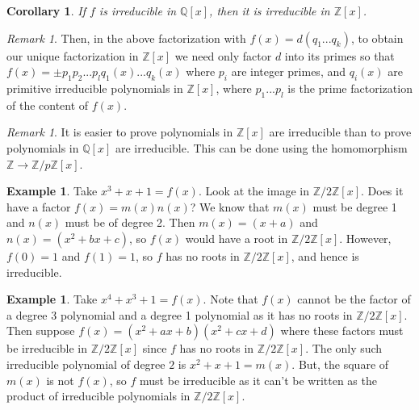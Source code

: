 \documentclass[12pt]{article}
\newtheorem{cor}[thm]{Corollary}
\theoremstyle{definition}
\newtheorem{eg}[thm]{Example}
\theoremstyle{remark}
\newtheorem{rmk}[thm]{Remark}
\numberwithin{equation}{section}
\newcommand\Z{\mathbb Z}    %
\newcommand\Q{\mathbb Q}    %
\begin{document}
\vspace{15pt}

\begin{cor}
        If $f$ is irreducible in $\Q[x]$, then it is irreducible in $\Z[x]$.
\end{cor}

\vspace{15pt}

\begin{rmk}
        Then, in the above factorization with $f(x) = d(q_1...q_k)$, to obtain our unique factorization in $\Z[x]$ we need only factor $d$ into its primes so that $f(x) = \pm p_1p_2...p_lq_1(x)...q_k(x)$ where $p_i$ are integer primes, and $q_i(x)$ are primitive irreducible polynomials in $\Z[x]$, where $p_1...p_l$ is the prime factorization of the content of $f(x)$.
\end{rmk}

\vspace{15pt}

\begin{rmk}
        It is easier to prove polynomials in $\Z[x]$ are irreducible than to prove polynomials in $\Q[x]$ are irreducible. This can be done using the homomorphism $\Z\rightarrow \Z/p\Z[x]$.
\end{rmk}


\vspace{15pt}

\begin{eg}
        Take $x^3 + x + 1 = f(x)$. Look at the image in $\Z/2\Z[x]$. Does it have a factor $f(x) = m(x)n(x)$? We know that $m(x)$ must be degree 1 and $n(x)$ must be of degree 2. Then $m(x) = (x+a)$ and $n(x) = (x^2+bx+c)$, so $f(x)$ would have a root in $\Z/2\Z[x]$. However, $f(0) = 1$ and $f(1) = 1$, so $f$ has no roots in $\Z/2\Z[x]$, and hence is irreducible.
\end{eg}


\vspace{15pt}

\begin{eg}
        Take $x^4+x^3+1 = f(x).$ Note that $f(x)$ cannot be the factor of a degree 3 polynomial and a degree 1 polynomial as it has no roots in $\Z/2\Z[x]$. Then suppose $f(x) = (x^2+ax+b)(x^2+cx+d)$ where these factors must be irreducible in $\Z/2\Z[x]$ since $f$ has no roots in $\Z/2\Z[x]$. The only such irreducible polynomial of degree $2$ is $x^2+x+1 = m(x)$. But, the square of $m(x)$ is not $f(x)$, so $f$ must be irreducible as it can't be written as the product of irreducible polynomials in $\Z/2\Z[x]$.
\end{eg}
\end{document}
